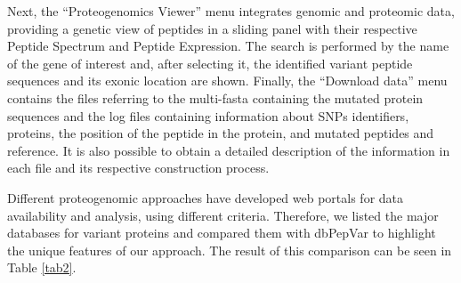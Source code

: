 \documentclass{ieeeaccess}
\begin{document}
Next, the ``Proteogenomics Viewer'' menu \cite{Kroll2017-ab} integrates genomic and proteomic data, providing a genetic view of peptides in a sliding panel with their respective Peptide Spectrum and Peptide Expression. The search is performed by the name of the gene of interest and, after selecting it, the identified variant peptide sequences and its exonic location are shown. Finally, the ``Download data'' menu contains the files referring to the multi-fasta containing the mutated protein sequences and the log files containing information about SNPs identifiers, proteins, the position of the peptide in the protein, and mutated peptides and reference. It is also possible to obtain a detailed description of the information in each file and its respective construction process. 

Different proteogenomic approaches have developed web portals for data availability and analysis, using different criteria. Therefore, we listed the major databases for variant proteins and compared them with dbPepVar to highlight the unique features of our approach. The result of this comparison can be seen in Table \ref{tab2}. 
\end{document}

